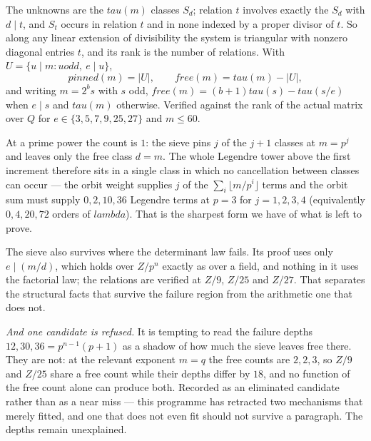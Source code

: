 \documentclass[12pt,a4paper]{article}
\def\mathbb#1{#1}%
\def\mathrm#1{#1}%
\def\mathbf#1{#1}%
\def\text#1{#1}%
\def\lambda{lambda}%
\def\tau{tau}%
\theoremstyle{definition}
\newcommand{\ZZ}{\mathbb{Z}}
\begin{document}
The unknowns are the $\tau(m)$ classes $S_d$; relation $t$ involves exactly the
$S_d$ with $d\mid t$, and $S_t$ occurs in relation $t$ and in none indexed by a
proper divisor of $t$.  So along any linear extension of divisibility the system
is triangular with nonzero diagonal entries $t$, and its rank is the number of
relations.  With $U=\{u\mid m: u\text{ odd},\ e\mid u\}$,
\[
\mathrm{pinned}(m)=\lvert U\rvert,\qquad
\mathrm{free}(m)=\tau(m)-\lvert U\rvert,
\]
and writing $m=2^{b}s$ with $s$ odd, $\mathrm{free}(m)=(b+1)\tau(s)-\tau(s/e)$
when $e\mid s$ and $\tau(m)$ otherwise.  Verified against the rank of the actual
matrix over $\mathbf{Q}$ for $e\in\{3,5,7,9,25,27\}$ and $m\le60$.

At a prime power the count is $1$: the sieve pins $j$ of the $j+1$ classes at
$m=p^{j}$ and leaves only the free class $d=m$.  The whole Legendre tower above
the first increment therefore sits in a single class in which no cancellation
between classes can occur --- the orbit weight supplies $j$ of the
$\sum_i\lfloor m/p^i\rfloor$ terms and the orbit sum must supply
$0,2,10,36$ Legendre terms at $p=3$ for $j=1,2,3,4$ (equivalently $0,4,20,72$ orders of $\lambda$).  That is the sharpest form we have of
what is left to prove.

The sieve also survives where the determinant law fails.  Its proof uses only
$e\mid(m/d)$, which holds over $\ZZ/p^{n}$ exactly as over a field, and nothing
in it uses the factorial law; the relations are verified at $\ZZ/9$, $\ZZ/25$
and $\ZZ/27$.  That separates the structural facts that survive the failure
region from the arithmetic one that does not.

\emph{And one candidate is refused.}  It is tempting to read the failure depths
$12,30,36=p^{n-1}(p+1)$ as a shadow of how much the sieve leaves free there.
They are not: at the relevant exponent $m=q$ the free counts are $2,2,3$, so
$\ZZ/9$ and $\ZZ/25$ share a free count while their depths differ by $18$, and
no function of the free count alone can produce both.  Recorded as an
eliminated candidate rather than as a near miss --- this programme has retracted
two mechanisms that merely fitted, and one that does not even fit should not
survive a paragraph.  The depths remain unexplained.
\end{document}
